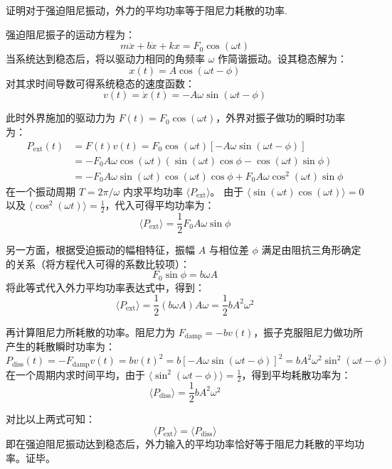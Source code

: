 \begin{exercise}\label{ex:7.8}
证明对于强迫阻尼振动，外力的平均功率等于阻尼力耗散的功率.
\end{exercise}
\begin{solution}
强迫阻尼振子的运动方程为：
$$ m \ddot{x} + b \dot{x} + k x = F_0 \cos(\omega t) $$
当系统达到稳态后，将以驱动力相同的角频率 $\omega$ 作简谐振动。设其稳态解为：
$$ x(t) = A \cos(\omega t - \phi) $$
对其求时间导数可得系统稳态的速度函数：
$$ v(t) = \dot{x}(t) = -A \omega \sin(\omega t - \phi) $$

此时外界施加的驱动力为 $F(t) = F_0 \cos(\omega t)$，外界对振子做功的瞬时功率为：
\begin{align*}
    P_{\text{ext}}(t) &= F(t) v(t) = F_0 \cos(\omega t) \left[ -A \omega \sin(\omega t - \phi) \right] \\
                      &= -F_0 A \omega \cos(\omega t) \left( \sin(\omega t)\cos\phi - \cos(\omega t)\sin\phi \right) \\
                      &= -F_0 A \omega \sin(\omega t) \cos(\omega t) \cos\phi + F_0 A \omega \cos^2(\omega t) \sin\phi
\end{align*}
在一个振动周期 $T = 2\pi/\omega$ 内求平均功率 $\langle P_{\text{ext}} \rangle$。
由于 $\langle \sin(\omega t)\cos(\omega t) \rangle = 0$ 以及 $\langle \cos^2(\omega t) \rangle = \frac{1}{2}$，代入可得平均功率为：
$$ \langle P_{\text{ext}} \rangle = \frac{1}{2} F_0 A \omega \sin\phi $$

另一方面，根据受迫振动的幅相特征，振幅 $A$ 与相位差 $\phi$ 满足由阻抗三角形确定的关系（将方程代入可得的系数比较项）：
$$ F_0 \sin\phi = b \omega A $$
将此等式代入外力平均功率表达式中，得到：
$$ \langle P_{\text{ext}} \rangle = \frac{1}{2} (b \omega A) A \omega = \frac{1}{2} b A^2 \omega^2 $$

再计算阻尼力所耗散的功率。阻尼力为 $F_{\text{damp}} = -b v(t)$，振子克服阻尼力做功所产生的耗散瞬时功率为：
$$ P_{\text{diss}}(t) = -F_{\text{damp}} v(t) = b v(t)^2 = b \left[ -A \omega \sin(\omega t - \phi) \right]^2 = b A^2 \omega^2 \sin^2(\omega t - \phi) $$
在一个周期内求时间平均，由于 $\langle \sin^2(\omega t - \phi) \rangle = \frac{1}{2}$，得到平均耗散功率为：
$$ \langle P_{\text{diss}} \rangle = \frac{1}{2} b A^2 \omega^2 $$

对比以上两式可知：
$$ \langle P_{\text{ext}} \rangle = \langle P_{\text{diss}} \rangle $$
即在强迫阻尼振动达到稳态后，外力输入的平均功率恰好等于阻尼力耗散的平均功率。证毕。
\end{solution}



